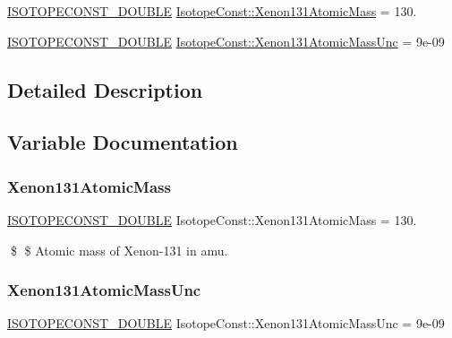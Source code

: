 \begin{DoxyCompactItemize}
\item 
\mbox{\hyperlink{group___isotope_const-_macros_ga8f45a7272ce02c0b4c65c44636ed719a}{I\+S\+O\+T\+O\+P\+E\+C\+O\+N\+S\+T\+\_\+\+D\+O\+U\+B\+LE}} \mbox{\hyperlink{group___isotope_const-_xenon-_xe131_gabf8bcd9584acc41325a892128e48028c}{Isotope\+Const\+::\+Xenon131\+Atomic\+Mass}} = 130.
\item 
\mbox{\hyperlink{group___isotope_const-_macros_ga8f45a7272ce02c0b4c65c44636ed719a}{I\+S\+O\+T\+O\+P\+E\+C\+O\+N\+S\+T\+\_\+\+D\+O\+U\+B\+LE}} \mbox{\hyperlink{group___isotope_const-_xenon-_xe131_gab93d35c441c54ee6c5233ebe5259078d}{Isotope\+Const\+::\+Xenon131\+Atomic\+Mass\+Unc}} = 9e-\/09
\end{DoxyCompactItemize}


\subsection{Detailed Description}


\subsection{Variable Documentation}
\mbox{\label{group___isotope_const-_xenon-_xe131_gabf8bcd9584acc41325a892128e48028c}} 
\subsubsection{\texorpdfstring{Xenon131\+Atomic\+Mass}{Xenon131AtomicMass}}
{\footnotesize\ttfamily \mbox{\hyperlink{group___isotope_const-_macros_ga8f45a7272ce02c0b4c65c44636ed719a}{I\+S\+O\+T\+O\+P\+E\+C\+O\+N\+S\+T\+\_\+\+D\+O\+U\+B\+LE}} Isotope\+Const\+::\+Xenon131\+Atomic\+Mass = 130.}

\$ \$ Atomic mass of Xenon-\/131 in amu. \mbox{\label{group___isotope_const-_xenon-_xe131_gab93d35c441c54ee6c5233ebe5259078d}} 
\subsubsection{\texorpdfstring{Xenon131\+Atomic\+Mass\+Unc}{Xenon131AtomicMassUnc}}
{\footnotesize\ttfamily \mbox{\hyperlink{group___isotope_const-_macros_ga8f45a7272ce02c0b4c65c44636ed719a}{I\+S\+O\+T\+O\+P\+E\+C\+O\+N\+S\+T\+\_\+\+D\+O\+U\+B\+LE}} Isotope\+Const\+::\+Xenon131\+Atomic\+Mass\+Unc = 9e-\/09}

